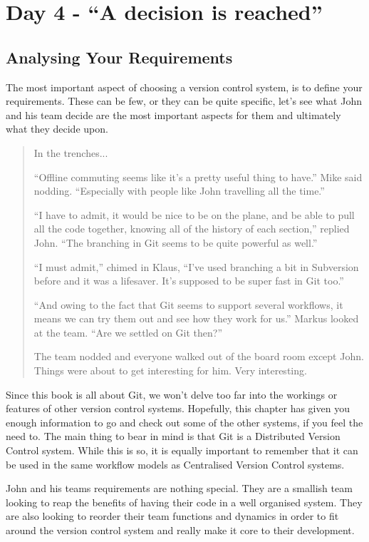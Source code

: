 \section*{Day 4 - ``A decision is reached''}

\subsection*{Analysing Your Requirements}

The most important aspect of choosing a version control system, is to define your requirements.  These can be few, or they can be quite specific, let's see what John and his team decide are the most important aspects for them and ultimately what they decide upon.

\begin{quote}In the trenches...

``Offline commuting seems like it's a pretty useful thing to have.''  Mike said nodding.  ``Especially with people like John travelling all the time.''

``I have to admit, it would be nice to be on the plane, and be able to pull all the code together, knowing all of the history of each section,'' replied John.  ``The branching in Git seems to be quite powerful as well.''

``I must admit,'' chimed in Klaus, ``I've used branching a bit in Subversion before and it was a lifesaver.  It's supposed to be super fast in Git too.''

``And owing to the fact that Git seems to support several workflows, it means we can try them out and see how they work for us.''  Markus looked at the team.  ``Are we settled on Git then?''

The team nodded and everyone walked out of the board room except John.  Things were about to get interesting for him.  Very interesting.
\end{quote}

Since this book is all about Git, we won't delve too far into the workings or features of other version control systems.  Hopefully, this chapter has given you enough information to go and check out some of the other systems, if you feel the need to.  The main thing to bear in mind is that Git is a Distributed Version Control system.  While this is so, it is equally important to remember that it can be used in the same workflow models as Centralised Version Control systems.

John and his teams requirements are nothing special.  They are a smallish team looking to reap the benefits of having their code in a well organised system.  They are also looking to reorder their team functions and dynamics in order to fit around the version control system and really make it core to their development.  

